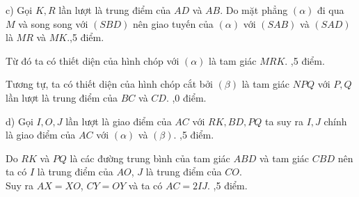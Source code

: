 \begin{bt}
{		
		c) Gọi $K, R$ lần lượt là trung điểm của $AD$ và $AB$. Do mặt phẳng $(\alpha)$ đi qua $M$ và song song với $(SBD)$ nên giao tuyến của $(\alpha)$ với $(SAB)$ và $(SAD)$ là $MR$ và $MK$.,5 điểm.
		
		Từ đó ta có thiết diện của hình chóp với $(\alpha)$ là tam giác $MRK$. ,5 điểm.
		
		Tương tự, ta có thiết diện của hình chóp cắt bởi $(\beta)$ là tam giác $NPQ$ với $P, Q$ lần lượt là trung điểm của $BC$ và $CD$. ,0 điểm.
		
		d) Gọi $I, O, J$ lần lượt là giao điểm của $AC$ với $RK, BD, PQ$ ta suy ra $I, J$ chính là giao điểm của $AC$ với $(\alpha)$ và $(\beta)$. ,5 điểm.
		
		Do $RK$ và $PQ$ là các đường trung bình của tam giác $ABD$ và tam giác $CBD$ nên ta có $I$ là trung điểm của $AO$, $J$ là trung điểm của $CO$.\\
		Suy ra $AX=XO$, $CY=OY$ và ta có $AC=2IJ$. ,5 điểm.
		
		
	}
\end{bt}

